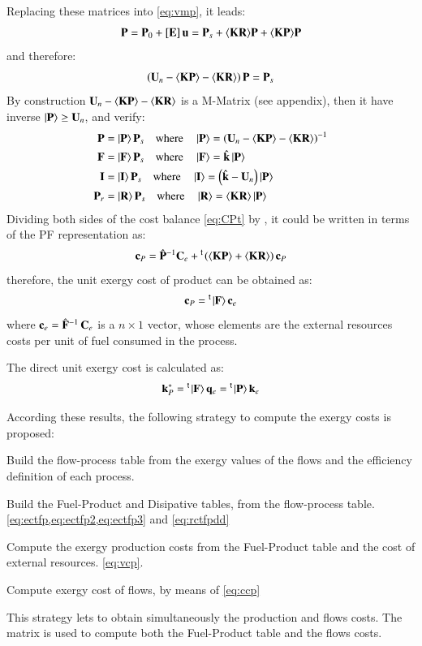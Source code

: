 \documentclass{ecos2018}
\begin{document}
Replacing these matrices into \cref{eq:vmp}, it leads:
\[
\mathbf{P}=\mathbf{P}_0 + \left[ \textbf{E} \right]\mathbf{u} = \mathbf{P}_s + \langle \textbf{KR} \rangle\mathbf{P} + \langle \textbf{KP} \rangle\mathbf{P}
\]
and therefore:
\begin{equation}
\left(\mathbf{U}_n-\langle \textbf{KP} \rangle-\langle \textbf{KR} \rangle\right)\mathbf{P}=\mathbf{P}_s
\end{equation}
By construction $\mathbf{U}_n-\langle \textbf{KP} \rangle-\langle \textbf{KR} \rangle$ is a M-Matrix (see appendix), then it have inverse $\left| {\textbf{P} } \right\rangle\ge \mathbf{U}_n$, and verify:
\begin{align}
\mathbf{P} &= \left| {\textbf{P} } \right\rangle \mathbf{P}_s  \quad \text{where}
\quad \left| {\textbf{P} } \right\rangle =\left( \mathbf{U}_n - \langle \textbf{KP} \rangle -\langle \textbf{KR} \rangle \right)^{-1} \label{eq:mopdp}\\
\mathbf{F} &= \left| {\textbf{F} } \right\rangle \mathbf{P}_s \quad \text{where}
\quad \left| {\textbf{F} } \right\rangle =\hat{\mathbf{k}}\left| {\textbf{P} } \right\rangle \label{eq:mopdf} \\ 
\mathbf{I} &= \left| {\textbf{I} } \right\rangle \mathbf{P}_s  \quad \text{where}
\quad \left| {\textbf{I} } \right\rangle =\left( \hat{\mathbf{k}} - \mathbf{U}_n \right)\left| {\textbf{P} } \right\rangle  \label{eq:mopdi}\\
\mathbf{P}_r &= \left| {\textbf{R} } \right\rangle \mathbf{P}_s \quad \text{where}
\quad \left| {\textbf{R} } \right\rangle =\langle \textbf{KR} \rangle\left| {\textbf{P} } \right\rangle  \label{eq:mopdr}
\end{align}
Dividing both sides of the cost balance \cref{eq:CPt} by , it could be written in terms of the PF representation as:
\begin{equation}
\mathbf{c}_P = \hat{\mathbf{P}}^{-1} \mathbf{C}_e  + \prescript{\smash{\mathsf{t}}}{}{\mskip-1mu}\left(\langle \textbf{KP} \rangle+\langle \textbf{KR} \rangle\right)  \mathbf{c}_P
\end{equation}
therefore, the unit exergy cost of product can be obtained as:
\begin{equation}
\label{eq:vcp}
\mathbf{c}_P =  \prescript{\smash{\mathsf{t}}}{}{\mskip-1mu}\left| {\textbf{F} } \right\rangle \mathbf{c}_e
\end{equation}
where $\mathbf{c}_e=\hat{\mathbf{F}}^{-1}\,\mathbf{C}_e$ is a $n \times 1$ vector, whose elements are the external resources costs  per unit of fuel consumed in the process.

The direct unit exergy cost is calculated as:
\begin{equation}
\mathbf{k}_{P}^{*}=\prescript{\smash{\mathsf{t}}}{}{\mskip-1mu}\left| {\textbf{F} } \right\rangle\mathbf{q}_e  =  \prescript{\smash{\mathsf{t}}}{}{\mskip-1mu}\left| {\textbf{P} } \right\rangle\mathbf{k}_e
\end{equation}

According these results, the following strategy to compute the exergy costs is proposed:
\begin{compactenum}[(i)]
	\item Build the flow-process table from the exergy values of the flows and the efficiency definition of each process.
	\item Build the Fuel-Product and Disipative tables, from the flow-process table. \cref{eq:ectfp,eq:ectfp2,eq:ectfp3} and \cref{eq:rctfpdd}
	\item Compute the exergy production costs from the Fuel-Product table and the cost of external resources. \cref{eq:vcp}.
	\item Compute exergy cost of flows, by means of \cref{eq:ccp}
\end{compactenum}
This strategy lets to obtain simultaneously the production and flows costs. The matrix  is used to compute both the Fuel-Product table and the flows costs.
\end{document}
